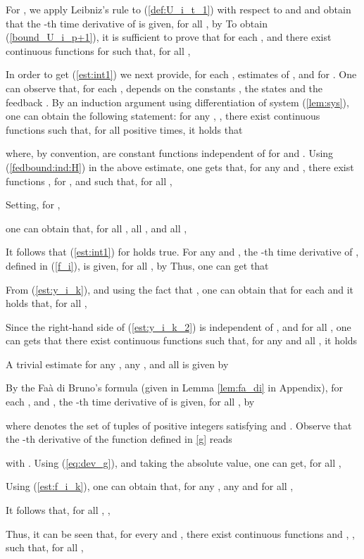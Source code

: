 \documentclass[letterpaper, 10pt]{article}
\newcommand{\rref}[1]{(\ref{#1})}
\begin{document}
For , we apply Leibniz's rule to \rref{def:U_i_t_1} with respect to  and  and obtain that the -th time derivative of  is given, for all , by 
 To obtain \rref{bound_U_i_p+1}, it is sufficient to prove that for each , and  there exist continuous functions  for  such that, for all ,


In order to get \rref{est:int1} we next provide,  for each , estimates of ,  and  for . One can observe that, for each ,  depends on the constants , the states  and the feedback . By an induction argument using differentiation of system \rref{lem:sys}, one can obtain the following statement: for any , , there exist continuous functions 
 such that, for all positive times, it holds that
 
where, by convention,  are constant functions independent of  for  and . Using \rref{fedbound:ind:H} in the above estimate, one gets that, for any  and , there exist functions , for , and  such that, for all ,
 
Setting, for , 
 
one can obtain that,  for all , all , and all ,

It follows that \rref{est:int1} for  holds true. For any  and , the -th time derivative of , defined in \rref{f_i}, is given, for all , by 
 Thus, one can get that

From \rref{est:y_i_k}, and using the fact that , one can obtain that for each  and  it holds that, for all ,
 
Since the right-hand side of \rref{est:y_i_k_2} is independent of , and  for all , one can gets that there exist continuous functions 
 such that, for any  and all , it holds
 
A trivial estimate for any , any , and all  is given by




By the Fa\`a di Bruno's formula (given in Lemma \ref{lem:fa_di} in Appendix), for each , and , the -th time derivative of  is given, for all , by
 
where  denotes the set of tuples   of positive integers satisfying  and .
Observe that the -th derivative of the function  defined in \eqref{g} reads

with . Using \rref{eq:dev_g}, and taking the absolute value, one can get, for all ,

Using \rref{est:f_i_k}, one can obtain that, for any , any  and for all , 

It follows that, for all ,  ,


Thus, it can be seen that, for every  and , there exist continuous functions  and , , such that, for all ,
\end{document}
